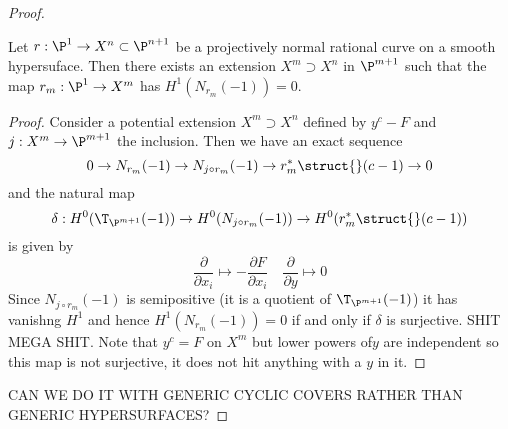 \documentclass[12pt]{article}
\theoremstyle{plain}
\begin{document}
\begin{proof}
\begin{lemma}
Let $r : \P^1 \to X^n \subset \P^{n+1}$ be a projectively normal rational curve on a smooth hypersuface. Then there exists an extension $X^m \supset X^n$ in $\P^{m+1}$ such that the map $r_m : \P^1 \to X^m$ has $H^1(N_{r_m}(-1)) = 0$. 
\end{lemma}

\begin{proof}
Consider a potential extension $X^m \supset X^n$ defined by $y^c - F$ and $j : X^m \to \P^{m+1}$ the inclusion. Then we have an exact sequence
\[ 0 \to N_{r_m}(-1) \to N_{j \circ r_m}(-1) \to r_m^* \struct{}(c-1) \to 0 \]
and the natural map
\[ \delta : H^0(\T_{\P^{m+1}}(-1)) \to H^0(N_{j \circ r_m}(-1)) \to H^0(r^*_m \struct{}(c-1)) \]
is given by
\[ \frac{\partial}{\partial x_i} \mapsto -\frac{\partial F}{\partial x_i} \quad \frac{\partial}{\partial y} \mapsto 0 \]
Since $N_{j \circ r_m}(-1)$ is semipositive (it is a quotient of $\T_{\P^{m+1}}(-1)$) it has vanishng $H^1$ and hence $H^1(N_{r_m}(-1)) = 0$ if and only if $\delta$ is surjective. {\color{red} SHIT MEGA SHIT}. Note that $y^c = F$ on $X^m$ but lower powers of$y$ are independent so this map is not surjective, it does not hit anything with a $y$ in it. 
\end{proof}

{\color{red} CAN WE DO IT WITH GENERIC CYCLIC COVERS RATHER THAN GENERIC HYPERSURFACES?}


\end{proof}
\end{document}

